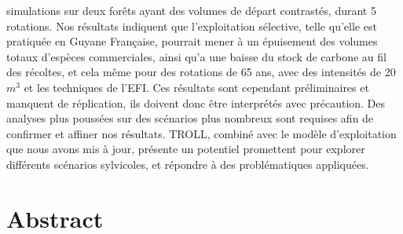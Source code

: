 \documentclass[12pt,]{article}
\let\oldsection\section
\renewcommand\section{\newpage\oldsection}
\theoremstyle{definition}
\theoremstyle{definition}
\theoremstyle{definition}
\theoremstyle{remark}
\begin{document}
simulations sur deux forêts ayant des volumes de départ contrastés,
durant 5 rotations. Nos résultats indiquent que l'exploitation
sélective, telle qu'elle est pratiquée en Guyane Française, pourrait
mener à un épuisement des volumes totaux d'espèces commerciales, ainsi
qu'a une baisse du stock de carbone au fil des récoltes, et cela même
pour des rotations de 65 ans, avec des intensités de 20\(m^3\) et les
techniques de l'EFI. Ces résultats sont cependant préliminaires et
manquent de réplication, ils doivent donc être interprétés avec
précaution. Des analyses plus poussées sur des scénarios plus nombreux
sont requises afin de confirmer et affiner nos résultats. TROLL, combiné
avec le modèle d'exploitation que nous avons mis à jour, présente un
potentiel promettent pour explorer différents scénarios sylvicoles, et
répondre à des problématiques appliquées.

\section{Abstract}\label{abstract}
\end{document}
